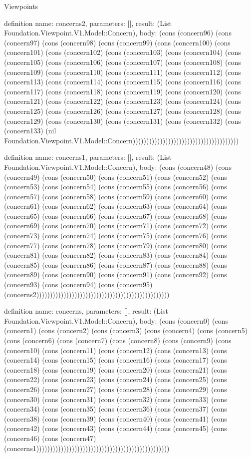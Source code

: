 \begin{lexlean}{Viewpoints}
\begin{semanticmodule}
definition{
  name: concerns2,
  parameters: [],
  result: (List Foundation.Viewpoint.V1.Model::Concern),
  body: (cons (concern96) (cons (concern97) (cons (concern98) (cons (concern99) (cons (concern100) (cons (concern101) (cons (concern102) (cons (concern103) (cons (concern104) (cons (concern105) (cons (concern106) (cons (concern107) (cons (concern108) (cons (concern109) (cons (concern110) (cons (concern111) (cons (concern112) (cons (concern113) (cons (concern114) (cons (concern115) (cons (concern116) (cons (concern117) (cons (concern118) (cons (concern119) (cons (concern120) (cons (concern121) (cons (concern122) (cons (concern123) (cons (concern124) (cons (concern125) (cons (concern126) (cons (concern127) (cons (concern128) (cons (concern129) (cons (concern130) (cons (concern131) (cons (concern132) (cons (concern133) (nil Foundation.Viewpoint.V1.Model::Concern)))))))))))))))))))))))))))))))))))))))
}

definition{
  name: concerns1,
  parameters: [],
  result: (List Foundation.Viewpoint.V1.Model::Concern),
  body: (cons (concern48) (cons (concern49) (cons (concern50) (cons (concern51) (cons (concern52) (cons (concern53) (cons (concern54) (cons (concern55) (cons (concern56) (cons (concern57) (cons (concern58) (cons (concern59) (cons (concern60) (cons (concern61) (cons (concern62) (cons (concern63) (cons (concern64) (cons (concern65) (cons (concern66) (cons (concern67) (cons (concern68) (cons (concern69) (cons (concern70) (cons (concern71) (cons (concern72) (cons (concern73) (cons (concern74) (cons (concern75) (cons (concern76) (cons (concern77) (cons (concern78) (cons (concern79) (cons (concern80) (cons (concern81) (cons (concern82) (cons (concern83) (cons (concern84) (cons (concern85) (cons (concern86) (cons (concern87) (cons (concern88) (cons (concern89) (cons (concern90) (cons (concern91) (cons (concern92) (cons (concern93) (cons (concern94) (cons (concern95) (concerns2)))))))))))))))))))))))))))))))))))))))))))))))))
}

definition{
  name: concerns,
  parameters: [],
  result: (List Foundation.Viewpoint.V1.Model::Concern),
  body: (cons (concern0) (cons (concern1) (cons (concern2) (cons (concern3) (cons (concern4) (cons (concern5) (cons (concern6) (cons (concern7) (cons (concern8) (cons (concern9) (cons (concern10) (cons (concern11) (cons (concern12) (cons (concern13) (cons (concern14) (cons (concern15) (cons (concern16) (cons (concern17) (cons (concern18) (cons (concern19) (cons (concern20) (cons (concern21) (cons (concern22) (cons (concern23) (cons (concern24) (cons (concern25) (cons (concern26) (cons (concern27) (cons (concern28) (cons (concern29) (cons (concern30) (cons (concern31) (cons (concern32) (cons (concern33) (cons (concern34) (cons (concern35) (cons (concern36) (cons (concern37) (cons (concern38) (cons (concern39) (cons (concern40) (cons (concern41) (cons (concern42) (cons (concern43) (cons (concern44) (cons (concern45) (cons (concern46) (cons (concern47) (concerns1)))))))))))))))))))))))))))))))))))))))))))))))))
}


\end{semanticmodule}
\end{lexlean}
